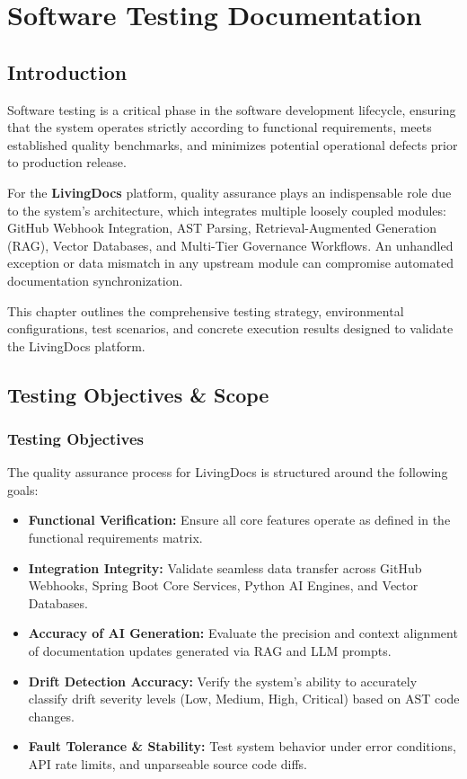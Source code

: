 \chapter{Software Testing Documentation}

\section{Introduction}
Software testing is a critical phase in the software development lifecycle, ensuring that the system operates strictly according to functional requirements, meets established quality benchmarks, and minimizes potential operational defects prior to production release. 

For the \textbf{LivingDocs} platform, quality assurance plays an indispensable role due to the system's architecture, which integrates multiple loosely coupled modules: GitHub Webhook Integration, AST Parsing, Retrieval-Augmented Generation (RAG), Vector Databases, and Multi-Tier Governance Workflows. An unhandled exception or data mismatch in any upstream module can compromise automated documentation synchronization.

This chapter outlines the comprehensive testing strategy, environmental configurations, test scenarios, and concrete execution results designed to validate the LivingDocs platform.

\section{Testing Objectives \& Scope}

\subsection{Testing Objectives}
The quality assurance process for LivingDocs is structured around the following goals:
\begin{itemize}
    \item \textbf{Functional Verification:} Ensure all core features operate as defined in the functional requirements matrix.
    \item \textbf{Integration Integrity:} Validate seamless data transfer across GitHub Webhooks, Spring Boot Core Services, Python AI Engines, and Vector Databases.
    \item \textbf{Accuracy of AI Generation:} Evaluate the precision and context alignment of documentation updates generated via RAG and LLM prompts.
    \item \textbf{Drift Detection Accuracy:} Verify the system's ability to accurately classify drift severity levels (Low, Medium, High, Critical) based on AST code changes.
    \item \textbf{Fault Tolerance \& Stability:} Test system behavior under error conditions, API rate limits, and unparseable source code diffs.
\end{itemize}

